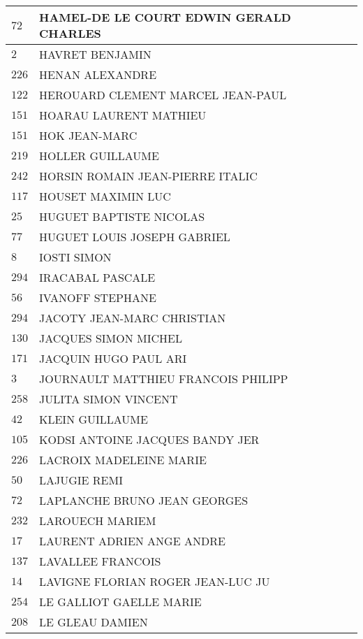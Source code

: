 \begin{xltabular}{\linewidth}{|l|X|}
    $72$ & HAMEL-DE LE COURT EDWIN GERALD CHARLES \\
    \hline
    $2$ & HAVRET BENJAMIN \\
    \hline
    $226$ & HENAN ALEXANDRE \\
    \hline
    $122$ & HEROUARD CLEMENT MARCEL JEAN-PAUL \\
    \hline
    $151$ & HOARAU LAURENT MATHIEU \\
    \hline
    $151$ & HOK JEAN-MARC \\
    \hline
    $219$ & HOLLER GUILLAUME \\
    \hline
    $242$ & HORSIN ROMAIN JEAN-PIERRE ITALIC \\
    \hline
    $117$ & HOUSET MAXIMIN LUC \\
    \hline
    $25$ & HUGUET BAPTISTE NICOLAS \\
    \hline
    $77$ & HUGUET LOUIS JOSEPH GABRIEL \\
    \hline
    $8$ & IOSTI SIMON \\
    \hline
    $294$ & IRACABAL PASCALE \\
    \hline
    $56$ & IVANOFF STEPHANE \\
    \hline
    $294$ & JACOTY JEAN-MARC CHRISTIAN \\
    \hline
    $130$ & JACQUES SIMON MICHEL \\
    \hline
    $171$ & JACQUIN HUGO PAUL ARI \\
    \hline
    $3$ & JOURNAULT MATTHIEU FRANCOIS PHILIPP \\
    \hline
    $258$ & JULITA SIMON VINCENT \\
    \hline
    $42$ & KLEIN GUILLAUME \\
    \hline
    $105$ & KODSI ANTOINE JACQUES BANDY JER \\
    \hline
    $226$ & LACROIX MADELEINE MARIE \\
    \hline
    $50$ & LAJUGIE REMI \\
    \hline
    $72$ & LAPLANCHE BRUNO JEAN GEORGES \\
    \hline
    $232$ & LAROUECH MARIEM \\
    \hline
    $17$ & LAURENT ADRIEN ANGE ANDRE \\
    \hline
    $137$ & LAVALLEE FRANCOIS \\
    \hline
    $14$ & LAVIGNE FLORIAN ROGER JEAN-LUC JU \\
    \hline
    $254$ & LE GALLIOT GAELLE MARIE \\
    \hline
    $208$ & LE GLEAU DAMIEN \\

\end{xltabular}
